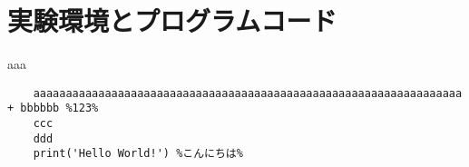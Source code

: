 \appendix
\chapter{実験環境とプログラムコード}
aaa

\begin{lstlisting}
    aaaaaaaaaaaaaaaaaaaaaaaaaaaaaaaaaaaaaaaaaaaaaaaaaaaaaaaaaaaaaaaaaa + bbbbbb %123%
    ccc
    ddd
    print('Hello World!') %こんにちは%
\end{lstlisting}

